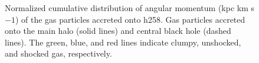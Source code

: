 \documentclass[]{emulateapj}
\begin{document}
\begin{figure}
\centerline{}
\caption[]{ Normalized cumulative distribution of angular momentum (kpc km s${{-1}}$) of the gas particles accreted onto h258.  Gas particles accreted onto the main halo (solid lines) and central black hole (dashed lines). The green, blue, and red lines indicate clumpy, unshocked, and shocked gas, respectively.}
\label{hrh258angmom} 
\end{figure}
\end{document}
